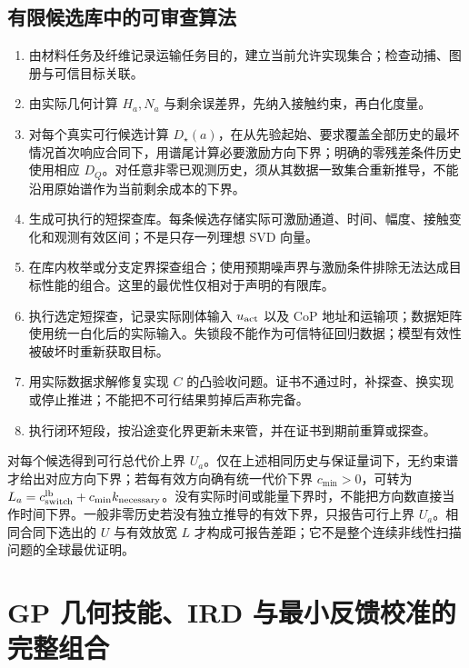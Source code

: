 \documentclass[11pt,a4paper]{article}
\numberwithin{equation}{section}
\theoremstyle{definition}
\begin{document}
\subsection{有限候选库中的可审查算法}
\begin{enumerate}
\item 由材料任务及纤维记录运输任务目的，建立当前允许实现集合；检查动捕、图册与可信目标关联。
\item 由实际几何计算 $H_a,N_a$ 与剩余误差界，先纳入接触约束，再白化度量。
\item 对每个真实可行候选计算 $D_\star(a)$，在从先验起始、要求覆盖全部历史的最坏情况首次响应合同下，用谱尾计算必要激励方向下界；明确的零残差条件历史使用相应 $D_Q$。对任意非零已观测历史，须从其数据一致集合重新推导，不能沿用原始谱作为当前剩余成本的下界。
\item 生成可执行的短探查库。每条候选存储实际可激励通道、时间、幅度、接触变化和观测有效区间；不是只存一列理想 SVD 向量。
\item 在库内枚举或分支定界探查组合；使用预期噪声界与激励条件排除无法达成目标性能的组合。这里的最优性仅相对于声明的有限库。
\item 执行选定短探查，记录实际刚体输入 $u_{\rm act}$ 以及 CoP 地址和运输项；数据矩阵使用统一白化后的实际输入。失锁段不能作为可信特征回归数据；模型有效性被破坏时重新获取目标。
\item 用实际数据求解修复实现 $C$ 的凸验收问题。证书不通过时，补探查、换实现或停止推进；不能把不可行结果剪掉后声称完备。
\item 执行闭环短段，按沿途变化界更新未来管，并在证书到期前重算或探查。
\end{enumerate}
对每个候选得到可行总代价上界 $U_a$。仅在上述相同历史与保证量词下，无约束谱才给出对应方向下界；若每有效方向确有统一代价下界 $c_{\min}>0$，可转为 $L_a=c_{\rm switch}^{\rm lb}+c_{\min}k_{\rm necessary}$。没有实际时间或能量下界时，不能把方向数直接当作时间下界。一般非零历史若没有独立推导的有效下界，只报告可行上界 $U_a$。相同合同下选出的 $U$ 与有效放宽 $L$ 才构成可报告差距；它不是整个连续非线性扫描问题的全球最优证明。



\section{GP 几何技能、IRD 与最小反馈校准的完整组合}
\label{sec:v43:integration}
\end{document}
